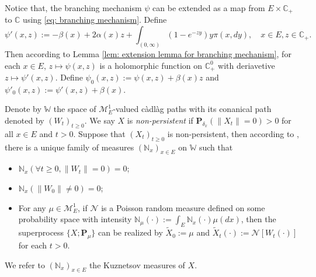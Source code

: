 \documentclass[12pt]{amsart}
\theoremstyle{plain}
\theoremstyle{definition}
\numberwithin{equation}{section}
\begin{document}
    Notice that, the branching mechanism $\psi$ can be extended as a map from $E \times \mathbb C_+$ to $\mathbb C$ using \eqref{eq: branching mechanism}.
    Define
\begin{equation}
    \psi'(x,z):= - \beta(x) + 2\alpha(x) z + \int_{(0,\infty)} (1-e^{-zy})y\pi(x,dy),
    \quad x\in E, z\in \mathbb C_+.
\end{equation}
    Then according to Lemma \ref{lem: extension lemma for branching mechanism}, for each $x \in E$, $z \mapsto \psi(x,z)$ is a holomorphic function on $\mathbb C_+^0$ with deriavetive $z \mapsto \psi'(x,z)$.
    Define $\psi_0(x,z) := \psi(x,z)+ \beta(x)z $ and $\psi'_0(x,z) := \psi'(x,z) + \beta(x)$.

    Denote by $\mathbb W$ the space of $\mathcal M_E^1$-valued c\`{a}dl\`{a}g paths with its conanical path denoted by $(W_t)_{t\geq 0}$.
    We say $X$ is \emph{non-persistent} if $\mathbf P_{\delta_x}(\|X_t\|= 0) > 0$ for all $x\in E$ and $t> 0$.
    Suppose that $(X_t)_{t\geq 0}$ is non-persistent, then according to \cite[Section 8.4]{Li2011Measure-valued},
    there is a unique family of measures $(\mathbb N_x)_{x\in E}$ on $\mathbb W$ such that
\begin{itemize}
\item
    $\mathbb N_x (\forall t \geq 0, \|W_t\|=0) =0$;
\item
    $\mathbb N_x(\|W_0 \|\neq 0) = 0$;
\item
    For any $\mu \in \mathcal M_E^1$, if $\mathcal N$ is a Poisson random measure defined on some probability space
    with intensity $\mathbb N_\mu(\cdot):= \int_E \mathbb N_x(\cdot )\mu(dx)$,
    then the superprocess $\{X;\mathbf P_\mu\}$ can be realized by $\widetilde X_0 := \mu$ and $\widetilde X_t(\cdot) := \mathcal N[W_t(\cdot)]$ for each $t>0$.
\end{itemize}
    We refer to $(\mathbb N_x)_{x\in E}$ the Kuznetsov measures of $X$.
\end{document}
